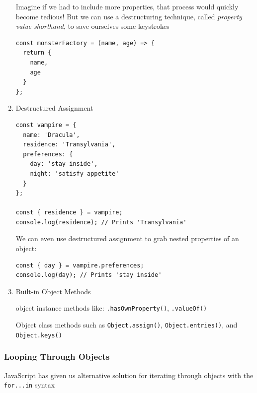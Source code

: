 \documentclass[a4paper, 12pt]{article}
\begin{document}
\begin{enumerate}
Imagine if we had to include more properties, that process would quickly become tedious! But we can use a destructuring technique, called \textit{property value shorthand}, to save ourselves some keystrokes
\begin{verbatim}
const monsterFactory = (name, age) => {
  return { 
    name,
    age 
  }
};
\end{verbatim}

\item Destructured Assignment
\begin{verbatim}
const vampire = {
  name: 'Dracula',
  residence: 'Transylvania',
  preferences: {
    day: 'stay inside',
    night: 'satisfy appetite'
  }
};

const { residence } = vampire; 
console.log(residence); // Prints 'Transylvania'
\end{verbatim}
We can even use destructured assignment to grab nested properties of an object:
\begin{verbatim}
const { day } = vampire.preferences; 
console.log(day); // Prints 'stay inside'
\end{verbatim}

\item Built-in Object Methods

object instance methods like: \verb|.hasOwnProperty()|, \verb|.valueOf()|

Object class methods such as \verb|Object.assign()|, \verb|Object.entries()|, and\\ \verb|Object.keys()|

\end{enumerate}

\subsubsection{Looping Through Objects}
JavaScript has given us alternative solution for iterating through objects with the \verb|for...in| syntax
\end{document}
